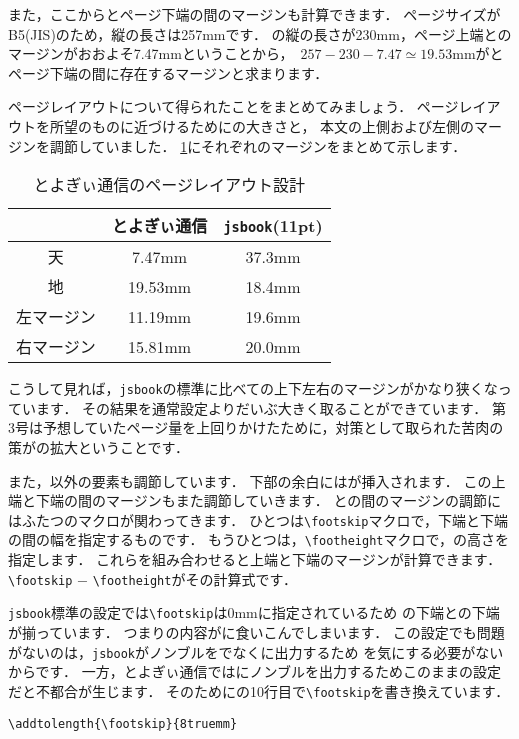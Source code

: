 また，ここからとページ下端の間のマージンも計算できます．
ページサイズがB5(JIS)のため，縦の長さは257mmです．
の縦の長さが230mm，ページ上端とのマージンがおおよそ7.47mmということから，
\,$257 - 230 - 7.47 \simeq 19.53\mathrm{mm}$がとページ下端の間に存在するマージンと求まります．

ページレイアウトについて得られたことをまとめてみましょう．
ページレイアウトを所望のものに近づけるためにの大きさと，
本文の上側および左側のマージンを調節していました．
\tablename\ref{tbl:toyogylayout}にそれぞれのマージンをまとめて示します．

\begin{table}[!ht]
	\centering
	\caption{とよぎぃ通信のページレイアウト設計}
	\label{tbl:toyogylayout}
	\begin{tabular}{c|c|c} \hline \hline
		& とよぎぃ通信 & \verb|jsbook|(11pt) \\ \hline
		天 & 7.47mm & 37.3mm \\
		地 & 19.53mm & 18.4mm \\
		左マージン & 11.19mm & 19.6mm \\
		右マージン & 15.81mm & 20.0mm \\ \hline
	\end{tabular}
\end{table}

こうして見れば，\verb|jsbook|の標準に比べての上下左右のマージンがかなり狭くなっています．
その結果を通常設定よりだいぶ大きく取ることができています．
第3号は予想していたページ量を上回りかけたために，対策として取られた苦肉の策がの拡大ということです．

また，以外の要素も調節しています．
下部の余白にはが挿入されます．
この上端と下端の間のマージンもまた調節していきます．
との間のマージンの調節にはふたつのマクロが関わってきます．
ひとつは\verb|\footskip|マクロで，下端と下端の間の幅を指定するものです．
もうひとつは，\verb|\footheight|マクロで，の高さを指定します．
これらを組み合わせると上端と下端のマージンが計算できます．
\verb|\footskip| $-$ \verb|\footheight|がその計算式です．

\texttt{jsbook}標準の設定では\verb|\footskip|は0mmに指定されているため
の下端との下端が揃っています．
つまりの内容がに食いこんでしまいます．
この設定でも問題がないのは，\texttt{jsbook}がノンブルをでなくに出力するため
を気にする必要がないからです．
一方，とよぎぃ通信ではにノンブルを出力するためこのままの設定だと不都合が生じます．
そのためにの10行目で\verb|\footskip|を書き換えています．
\begin{verbatim}
\addtolength{\footskip}{8truemm}
\end{verbatim}

